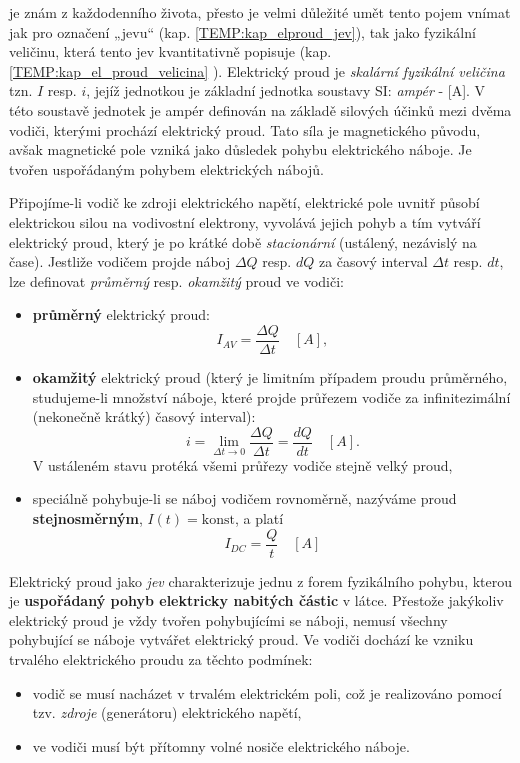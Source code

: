       \vspace{1em}
      \label{TEMP:kap_el_proud_velicina} je znám z každodenního života,
        přesto je velmi důležité umět tento pojem vnímat jak pro označení „jevu“ (kap.
        \ref{TEMP:kap_elproud_jev}), tak jako fyzikální veličinu, která tento jev kvantitativně
        popisuje (kap. \ref{TEMP:kap_el_proud_velicina} ). Elektrický proud je \emph{skalární
        fyzikální veličina} tzn. $I$ resp. $i$, jejíž jednotkou je základní jednotka soustavy SI:
        \emph{ampér} - [A]. V této soustavě jednotek je ampér definován na základě silových
        účinků mezi dvěma vodiči, kterými prochází elektrický proud. Tato síla je magnetického
        původu, avšak magnetické pole vzniká jako důsledek pohybu elektrického náboje. Je tvořen
        uspořádaným pohybem elektrických nábojů.
        
        Připojíme-li vodič ke zdroji elektrického napětí, elektrické pole uvnitř působí elektrickou
        silou na vodivostní elektrony, vyvolává jejich pohyb a tím vytváří elektrický proud, který
        je po krátké době \emph{stacionární} (ustálený, nezávislý na čase). Jestliže vodičem projde
        náboj $\Delta Q$ resp. $dQ$ za časový interval $\Delta t$ resp. $dt$, lze definovat
        \emph{průměrný} resp. \emph{okamžitý} proud ve vodiči:
        \begin{itemize}[noitemsep]
          \item \textbf{průměrný} elektrický proud: $$I_{AV} = \frac{\Delta Q}{\Delta t}
                \quad[A],$$
          \item \textbf{okamžitý} elektrický proud (který je limitním případem proudu průměrného,
                studujeme-li množství náboje, které projde průřezem vodiče za infinitezimální
                (nekonečně krátký) časový interval): $$i = \lim_{\Delta t \rightarrow 0}\frac{\Delta
                Q}{\Delta t} = \frac{dQ}{dt} \quad[A].$$ V ustáleném stavu protéká všemi průřezy
                vodiče stejně velký proud,
          \item speciálně pohybuje-li se náboj vodičem rovnoměrně, nazýváme proud
                \textbf{stejno\-směr\-ným}, $I(t) = \text{konst}$, a platí $$ I_{DC} =
                \frac{Q}{t}\quad[A] $$
        \end{itemize}        

        Elektrický proud jako \emph{jev} charakterizuje jednu z forem fyzikálního pohybu, kterou je
        \textbf{uspořádaný pohyb elektricky nabitých částic} v látce. Přestože jakýkoliv elektrický
        proud je vždy tvořen pohybujícími se náboji, nemusí všechny pohybující se náboje vytvářet
        elektrický proud. Ve vodiči dochází ke vzniku trvalého elektrického proudu za těchto
        podmínek:
          \begin{itemize}[noitemsep]
            \item vodič se musí nacházet v trvalém elektrickém poli, což je realizováno pomocí tzv.
                  \emph{zdroje} (generátoru) elektrického napětí,
            \item ve vodiči musí být přítomny volné nosiče elektrického náboje.
          \end{itemize}
        
